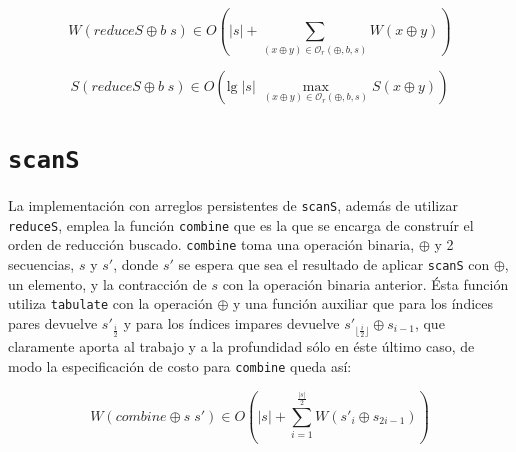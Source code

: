 \documentclass[a4paper,10pt]{article}
\begin{document}
\begin{equation*}
    W \left( reduceS \oplus b \; s \right) \in
    O \left( \vert s \vert + \sum_{(x \oplus y) \in \mathcal{O}_r(\oplus,b,s)} W \left( x \oplus y \right) \right)
\end{equation*}

\begin{equation*}
    S \left( reduceS \oplus b \; s \right) \in
    O \left( \text{lg} \; \vert s \vert \; \max_{(x \oplus y) \in \mathcal{O}_r(\oplus,b,s)} S \left( x \oplus y \right) \right)
\end{equation*}

\section*{\texttt{scanS}}

La implementación con arreglos persistentes de \texttt{scanS}, además de utilizar
\texttt{reduceS}, emplea la función \texttt{combine} que es la que se encarga de
construír el orden de reducción buscado.
\texttt{combine} toma una operación binaria, $\oplus$ y 2 secuencias, $s$ y $s'$,
donde $s'$ se espera que sea el resultado de aplicar \texttt{scanS} con $\oplus$,
un elemento, y la contracción de $s$ con la operación binaria anterior. Ésta función
utiliza \texttt{tabulate} con la operación $\oplus$ y una función auxiliar que
para los índices pares devuelve $s'_{\frac{i}{2}}$ y para los índices impares
devuelve $s'_{\lfloor \frac{i}{2} \rfloor} \oplus s_{i-1}$, que claramente
aporta al trabajo y a la profundidad sólo en éste último caso, de modo la especificación
de costo para \texttt{combine} queda así: 


\begin{equation*}
    W \left( combine \oplus s \; s' \right) \in
    O \left( \vert s \vert + \sum_{i=1}^{\frac{\vert s \vert}{2}} W \left( s'_{i} \oplus s_{2i-1} \right) \right)
\end{equation*}
\end{document}
